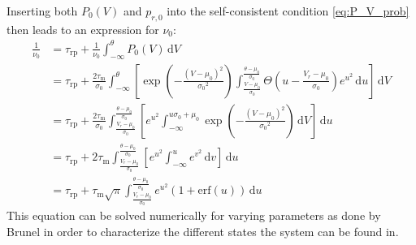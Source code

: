 Inserting both $P_0(V)$ and $p_{r, 0}$ into the self-consistent condition \eqref{eq:P_V_prob}
then leads to an expression for $\nu_0$:
\begin{equation}
    \begin{split}
        \frac{1}{\nu_0} 	
            &= \tau_\text{rp} + \frac{1}{\nu_0} \int_{-\infty}^{\theta} \! P_0(V) \, \text{d}V  \\ 
            &= \tau_\text{rp} + \frac{2 \tau_\text{m}}{\sigma_0} 
                \int_{-\infty}^{\theta} \! \left[ 
                    \exp{\left(- \frac{(V - \mu_0)^2}{{\sigma_0}^2} \right)}
                    \int_{\frac{V - \mu_0}{\sigma_0}}^{\frac{\theta - \mu_0}{\sigma_0}} \! 
                        \Theta \left(u - \frac{V_r - \mu_0}{\sigma_0} \right) e^{u^2} \, \text{d}u 
                    \right] \, \text{d}V  \\ 
            &= \tau_\text{rp} + \frac{2 \tau_\text{m}}{\sigma_0} 
                \int_{\frac{V_r - \mu_0}{\sigma_0}}^{\frac{\theta - \mu_0}{\sigma_0}} \! 
                    \left[ 
                        e^{u^2}
                        \int_{-\infty}^{u \sigma_0 + \mu_0} \! 
                        \exp{\left(- \frac{(V - \mu_0)^2}{{\sigma_0}^2} \right)}
                        \, \text{d}V
                    \right] \, \text{d}u  \\ 
            &= \tau_\text{rp} + 2 \tau_\text{m}
                \int_{\frac{V_r - \mu_0}{\sigma_0}}^{\frac{\theta - \mu_0}{\sigma_0}} \! 
                    \left[ 
                        e^{u^2}
                        \int_{-\infty}^{u} \! e^{v^2} \, \text{d}v
                    \right] \, \text{d}u  \\ 
            &= \tau_\text{rp} + \tau_\text{m} \sqrt{\pi}
                \int_{\frac{V_r - \mu_0}{\sigma_0}}^{\frac{\theta - \mu_0}{\sigma_0}} \! 
                e^{u^2} \left(1 + \text{erf}(u)\right)
                \, \text{d}u  
        \label{eq:self_consistency}
    \end{split}
\end{equation}
This equation can be solved numerically for varying parameters as done by Brunel in order to 
characterize the different states the system can be found in. 


